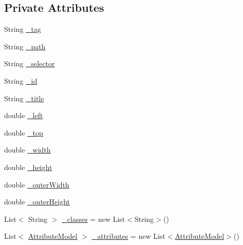 \subsection*{Private Attributes}
\begin{DoxyCompactItemize}
\item 
String \hyperlink{class_web_analyzer_1_1_models_1_1_data_model_1_1_d_o_m_element_model_a189cb52ec2fbbc5d2fad73187ffa9404}{\+\_\+tag}
\item 
String \hyperlink{class_web_analyzer_1_1_models_1_1_data_model_1_1_d_o_m_element_model_adcfc13a3bc75b3efb29b7328115d2996}{\+\_\+path}
\item 
String \hyperlink{class_web_analyzer_1_1_models_1_1_data_model_1_1_d_o_m_element_model_a1fba31f038cfcd20e7be095aa736695a}{\+\_\+selector}
\item 
String \hyperlink{class_web_analyzer_1_1_models_1_1_data_model_1_1_d_o_m_element_model_a4f824d5be5dd68766e0a50d5f27a8dfc}{\+\_\+id}
\item 
String \hyperlink{class_web_analyzer_1_1_models_1_1_data_model_1_1_d_o_m_element_model_a1f78ca7c25fcb00ee45f23482ae92c3a}{\+\_\+title}
\item 
double \hyperlink{class_web_analyzer_1_1_models_1_1_data_model_1_1_d_o_m_element_model_aeb026965e7f90ea485c57b8b78d019b0}{\+\_\+left}
\item 
double \hyperlink{class_web_analyzer_1_1_models_1_1_data_model_1_1_d_o_m_element_model_a2375d70647ec50aa1a497e9e9ab6aade}{\+\_\+top}
\item 
double \hyperlink{class_web_analyzer_1_1_models_1_1_data_model_1_1_d_o_m_element_model_ad89c6f97d80115d398e26e76eb2ab7b7}{\+\_\+width}
\item 
double \hyperlink{class_web_analyzer_1_1_models_1_1_data_model_1_1_d_o_m_element_model_a271887d24b632402d029618d0a208cfe}{\+\_\+height}
\item 
double \hyperlink{class_web_analyzer_1_1_models_1_1_data_model_1_1_d_o_m_element_model_a4812f06ca8225b4386f5e5ea45370550}{\+\_\+outer\+Width}
\item 
double \hyperlink{class_web_analyzer_1_1_models_1_1_data_model_1_1_d_o_m_element_model_a4d8c5283f4625e042bb2a98cdec323ce}{\+\_\+outer\+Height}
\item 
List$<$ String $>$ \hyperlink{class_web_analyzer_1_1_models_1_1_data_model_1_1_d_o_m_element_model_a6df986d1bb481e6aba1ab17c5f6c2fce}{\+\_\+classes} = new List$<$String$>$()
\item 
List$<$ \hyperlink{class_web_analyzer_1_1_models_1_1_data_model_1_1_attribute_model}{Attribute\+Model} $>$ \hyperlink{class_web_analyzer_1_1_models_1_1_data_model_1_1_d_o_m_element_model_ac907634afc4fec9be436d2ad08865246}{\+\_\+attributes} = new List$<$\hyperlink{class_web_analyzer_1_1_models_1_1_data_model_1_1_attribute_model}{Attribute\+Model}$>$()
\end{DoxyCompactItemize}


